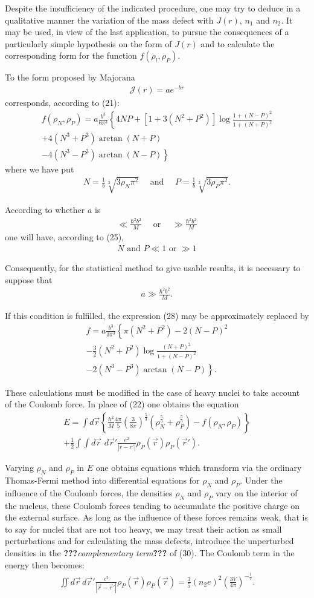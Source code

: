 \documentclass[a4paper,11pt]{article}
\newcommand{\WTF}[1]{\textbf{???}\textit{#1}\textbf{???}}
\newcommand{\?}[2]{#1\footnote{\textsc{Translator note}: #2}}
\newcommand{\nequ}[2]{\begin{align*}\tag{#1}#2\end{align*}}
\newcommand{\uequ}[1]{\begin{align*}#1\end{align*}}
\renewcommand{\exp}[1]{e^{#1}}
\begin{document}
{{Despite the insufficiency of the indicated procedure, one may try to deduce in a qualitative manner the variation of the mass defect with $J(r)$, $n_1$ and $n_2$. It may be used, in view of the last application, to pursue the consequences of a particularly simple hypothesis on the form of $J(r)$ and to calculate the corresponding form for the function $f(\rho_l, \rho_P)$.

To the form proposed by Majorana
\nequ{27}{
\mathcal{J}(r) = a\exp{-br}
}
corresponds, according to (21):
\nequ{28}{
f(\rho_N, \rho_P) = a\frac{b^3}{6\pi^3}\left\{4NP +
\left[1 + 3(N^2+P^2)\right]
\log{\frac{1+(N-P)^2}{1+(N+P)^2}}\right.\\
+ 4(N^3+P^3)\arctan{(N+P)}\\ \left.
- 4(N^3-P^3)\arctan{(N-P)}\right\}
}
where we have put
\uequ{
N=\frac{1}{b}\sqrt[3]{3\rho_N \pi^2}\quad
\text{ and }\quad
P=\frac{1}{b}\sqrt[3]{3\rho_P \pi^2}.
}

According to whether $a$ is
\uequ{
\ll \frac{\hbar^2 b^2}{M}
\quad\text{ or }\quad
\gg \frac{\hbar^2 b^2}{M}
}
one will have, according to (25),
\uequ{
N \text{ and } P \ll 1 \text { or } \gg 1
}

Consequently, for the statistical method to give usable results, it is necessary to suppose that
\uequ{
a \gg \frac{\hbar^2 b^2}{M}.
}

If this condition is fulfilled, the expression (28) may be approximately replaced by
\nequ{29}{
f=a\frac{b^3}{3\pi^3}\left\{\pi(N^2 + P^2) - 2(N-P)^2\right.\\
- \frac{3}{2}(N^2 + P^2)\log{\frac{(N+P)^2}{1+(N-P)^2}}\\
\left. - 2(N^3-P^3)\arctan{(N-P)}\right\}.
}

These calculations must be modified in the case of heavy nuclei to take account of the Coulomb force. In place of (22) one obtains the equation
\nequ{30}{
E = \int d\vec{r}\left\{\frac{h^2}{M}\frac{4\pi}{5}\left(\frac{3}{8\pi}\right)^\frac{5}{3}\left(\rho_N^\frac{5}{3} + \rho_P^\frac{5}{3}\right) - f(\rho_N, \rho_P)\right\}\\
+ \frac{1}{2}\int\int d\vec{r}\,\,d\vec{r}'\frac{e^2}{|r-r'|}\rho_P(\vec{r})\rho_P(\vec{r}').
}

Varying $\rho_N$ and $\rho_P$ in $E$ one obtains equations which transform via the ordinary Thomas-Fermi method into differential equations for $\rho_N$ and $\rho_P$. Under the influence of the Coulomb forces, the densities $\rho_N$ and $\rho_P$ vary on the interior of the nucleus, these Coulomb forces tending to accumulate the positive charge on the external surface. As long as the influence of these forces remains weak, that is to say for nuclei that are not too heavy, we may treat their action as small perturbations and for calculating the mass defects, introduce the unperturbed densities in the \WTF{complementary term} of (30). The Coulomb term in the energy then becomes:
\nequ{31}{
\iint d\vec{r}\, d\vec{r}' \frac{e^2}{|\vec{r} - \vec{r}'|}
\rho_P(\vec{r})\rho_P(\vec{r}) = \frac{3}{5}(n_2 e)^2
\left(\frac{3V}{4\pi}\right)^{-\frac{1}{3}}.
}

}}
\end{document}
